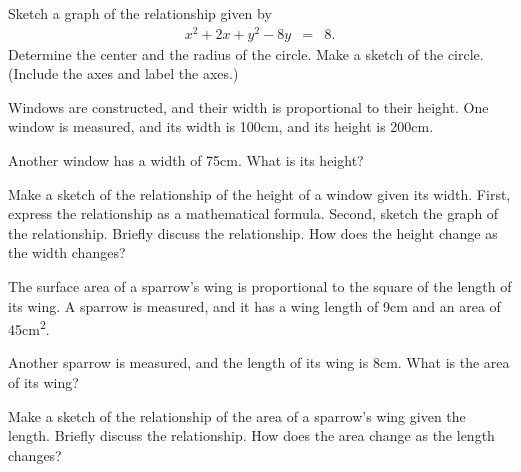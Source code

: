 \begin{problem}
  \clearpage

\item Sketch a graph of the relationship given by
  \begin{eqnarray*}
    x^2 + 2x + y^2 - 8y & = & 8.
  \end{eqnarray*}
  Determine the center and the radius of the circle.  Make a sketch of
  the circle. (Include the axes and label the axes.)  

  \vfill

  \clearpage

\item Windows are constructed, and their width is proportional to
  their height. One window is measured, and its width is 100cm, and its
  height is 200cm. 

  \begin{subproblem}

  \item Another window has a width of 75cm. What is its height?

    \vfill

  \item Make a sketch of the relationship of the height of a window
    given its width. First, express the relationship as a mathematical
    formula. Second, sketch the graph of the relationship. Briefly
    discuss the relationship. How does the height change as the width
    changes?  

    \vfill
    
  \end{subproblem}

  \clearpage

\item The surface area of a sparrow's wing is proportional to the
  square of the length of its wing. A sparrow is measured, and it has
  a wing length of 9cm and an area of 45cm\textsuperscript{2}. 

  \begin{subproblem}

  \item Another sparrow is measured, and the length of its wing is
    8cm. What is the area of its wing?

    \vfill

  \item Make a sketch of the relationship of the area of a sparrow's
    wing given the length. Briefly discuss the relationship. How does
    the area change as the length changes?  

    \vfill

  \end{subproblem}

  \vfill



\end{problem}

